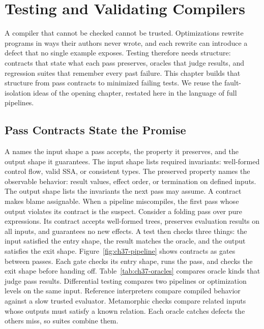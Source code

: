 \chapter{Testing and Validating Compilers}\label{ch:testing-validating-compilers}

A compiler that cannot be checked cannot be trusted.
Optimizations rewrite programs in ways their authors never wrote, and each rewrite can introduce a defect that no single example exposes.
Testing therefore needs structure: contracts that state what each pass preserves, oracles that judge results, and regression suites that remember every past failure.
This chapter builds that structure from pass contracts to minimized failing tests.
We reuse the fault-isolation ideas of the opening chapter, restated here in the language of full pipelines.

\section{Pass Contracts State the Promise}\label{sec:ch37-contracts}

A  names the input shape a pass accepts, the property it preserves, and the output shape it guarantees.
The input shape lists required invariants: well-formed control flow, valid SSA, or consistent types.
The preserved property names the observable behavior: result values, effect order, or termination on defined inputs.
The output shape lists the invariants the next pass may assume.
A contract makes blame assignable.
When a pipeline miscompiles, the first pass whose output violates its contract is the suspect.
Consider a folding pass over pure expressions.
Its contract accepts well-formed trees, preserves evaluation results on all inputs, and guarantees no new effects.
A test then checks three things: the input satisfied the entry shape, the result matches the oracle, and the output satisfies the exit shape.
Figure~\ref{fig:ch37-pipeline} shows contracts as gates between passes.
Each gate checks its entry shape, runs the pass, and checks the exit shape before handing off.
Table~\ref{tab:ch37-oracles} compares oracle kinds that judge pass results.
Differential testing compares two pipelines or optimization levels on the same input.
Reference interpreters compare compiled behavior against a slow trusted evaluator.
Metamorphic checks compare related inputs whose outputs must satisfy a known relation.
Each oracle catches defects the others miss, so suites combine them.

